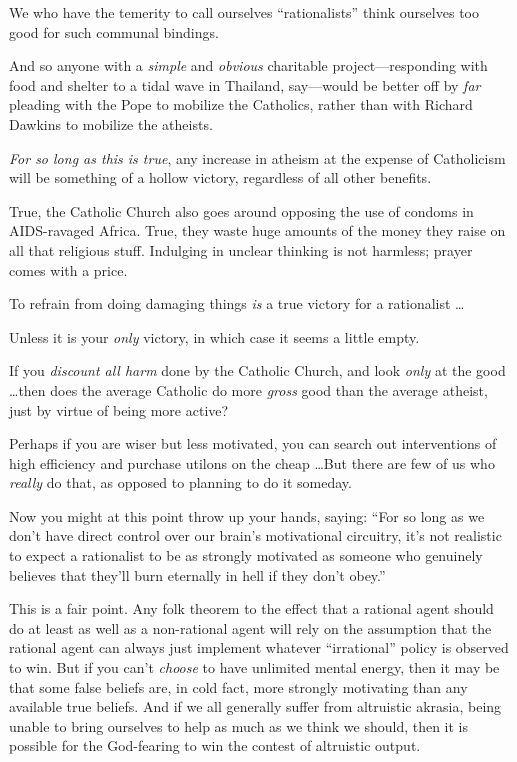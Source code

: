 {
 We who have the temerity to call ourselves
``rationalists'' think ourselves too
good for such communal bindings.}

{
 And so anyone with a \textit{simple} and \textit{obvious}
charitable project---responding with food and shelter to a tidal wave
in Thailand, say---would be better off by \textit{far} pleading with
the Pope to mobilize the Catholics, rather than with Richard Dawkins to
mobilize the atheists.}

{
 \textit{For so long as this is true}, any increase in atheism at
the expense of Catholicism will be something of a hollow victory,
regardless of all other benefits.}

{
 True, the Catholic Church also goes around opposing the use of
condoms in AIDS-ravaged Africa. True, they waste huge amounts of the
money they raise on all that religious stuff. Indulging in unclear
thinking is not harmless; prayer comes with a price.}

{
 To refrain from doing damaging things \textit{is} a true victory
for a rationalist \ldots}

{
 Unless it is your \textit{only} victory, in which case it seems a
little empty.}

{
 If you \textit{discount all harm} done by the Catholic Church, and
look \textit{only} at the good \ldots then does the average Catholic do
more \textit{gross} good than the average atheist, just by virtue of
being more active?}

{
 Perhaps if you are wiser but less motivated, you can search out
interventions of high efficiency and purchase utilons on the cheap
\ldots But there are few of us who \textit{really} do that, as opposed
to planning to do it someday.}

{
 Now you might at this point throw up your hands, saying:
``For so long as we don't have direct
control over our brain's motivational circuitry,
it's not realistic to expect a rationalist to be as
strongly motivated as someone who genuinely believes that
they'll burn eternally in hell if they
don't obey.''}

{
 This is a fair point. Any folk theorem to the effect that a
rational agent should do at least as well as a non-rational agent will
rely on the assumption that the rational agent can always just
implement whatever ``irrational''
policy is observed to win. But if you can't
\textit{choose} to have unlimited mental energy, then it may be that
some false beliefs are, in cold fact, more strongly motivating than any
available true beliefs. And if we all generally suffer from altruistic
akrasia, being unable to bring ourselves to help as much as we think we
should, then it is possible for the God-fearing to win the contest of
altruistic output.}

